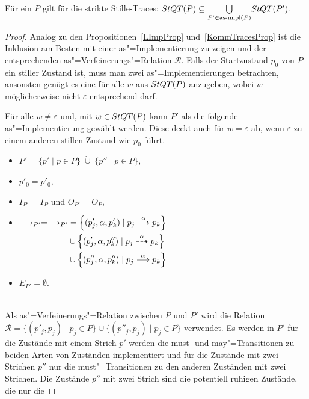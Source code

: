 \begin{Prop}
  \label{StilleTraceProp}
  Für ein \MEIO{} $P$ gilt für die strikte Stille-Traces: $StQT (P) \subseteq
  \underset{P'\in\mathrm{as}\text{-}\mathrm{impl} (P)}{\bigcup} StQT (P')$.
\end{Prop}
\begin{proof}
  Analog zu den Propositionen~\ref{LImpProp} und~\ref{KommTracesProp} ist die
  Inklusion am Besten mit einer as"=Implementierung zu zeigen und der
  entsprechenden as"=Verfeinerungs"=Relation $\mathcal{R}$. Falls der
  Startzustand $p_0$ von $P$ ein stiller Zustand ist, muss man zwei
  as"=Implementierungen betrachten, ansonsten genügt es eine für alle $w$ aus
  $StQT (P)$ anzugeben, wobei $w$ möglicherweise nicht $\varepsilon$
  entsprechend darf.

  Für alle $w\neq \varepsilon$ und, mit $w\in StQT (P)$ kann $P'$ als die
  folgende as"=Implementierung gewählt werden. Diese deckt auch für $w =
  \varepsilon$ ab, wenn $\varepsilon$ zu einem anderen stillen Zustand wie
  $p_0$ führt.
  \begin{itemize}
    \item $P'= \{p'\mid p\in P\}\; \dot{\cup}\; \{p''\mid p\in P\}$,
    \item $p'_0=p'_0$,
    \item $I_{P'}=I_P$ und $O_{P'}=O_P$,
    \item $\begin{aligned}[t] \must _{P'}=\may _{P'} &=
        \left\{(p'_j,\alpha ,p'_k)\mid p_j\may[\alpha] p_k\right\}\\
        &\cup \left\{(p'_j,\alpha ,p''_k)\mid p_j\may[\alpha] p_k\right\}\\
        &\cup \left\{(p''_j,\alpha ,p''_k)\mid p_j\must[\alpha] p_k\right\}
    \end{aligned}$
    \item $E_{P'}=\emptyset$.
  \end{itemize}
  \\
  Als as"=Verfeinerungs"=Relation zwischen $P$ und $P'$ wird die Relation
  $\mathcal{R}=\{(p'_j,p_j)\mid p_j\in P\} \cup \{(p''_j,p_j)\mid p_j\in P\}$
  verwendet. Es werden in $P'$ für die Zustände mit einem Strich $p'$ werden
  die must- und may"=Transitionen zu beiden \glqq Arten\grqq{} von Zuständen
  implementiert und für die Zustände mit zwei Strichen $p''$ nur die
  must"=Transitionen zu den anderen Zuständen mit zwei Strichen. Die Zustände
  $p''$ mit zwei Strich sind die potentiell ruhigen Zustände, die nur die

\end{proof}
